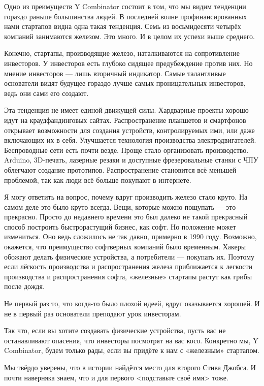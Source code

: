 \documentclass[ebook,12pt,oneside,openany]{memoir}
\begin{document}
\maketitle

Одно из преимуществ Y Combinator состоит в том, что мы видим тенденции
гораздо раньше большинства людей. В последней волне профинансированных
нами стартапов видна одна такая тенденция. Семь из восьмидесяти
четырёх компаний занимаются железом. Это много. И в целом их успехи
выше среднего.

Конечно, стартапы, производящие железо, наталкиваются на сопротивление
инвесторов. У инвесторов есть глубоко сидящее предубеждение против
них. Но мнение инвесторов — лишь вторичный индикатор. Самые
талантливые основатели видят будущее гораздо лучше самых
проницательных инвесторов, ведь они сами его создают.

Эта тенденция не имеет единой движущей силы. Хардварные проекты хорошо
идут на краудфандинговых сайтах. Распространение планшетов и
смартфонов открывает возможности для создания устройств,
контролируемых ими, или даже включающих их в себя. Улучшается
технология производства электродвигателей. Беспроводные сети есть
почти везде. Проще стало организовать производство. Arduino,
3D-печать, лазерные резаки и доступные фрезеровальные станки с ЧПУ
облегчают создание прототипов. Распространение становится всё меньшей
проблемой, так как люди всё больше покупают в интернете.

Я могу ответить на вопрос, почему вдруг производить железо стало
круто. На самом деле это было круто всегда. Вещи, которые можно
пощупать — это прекрасно. Просто до недавнего времени это был далеко
не такой прекрасный способ построить быстрорастущий бизнес, как софт.
Но положение может измениться. Оно ведь сложилось не так давно,
примерно в 1990 году. Возможно, окажется, что преимущество софтверных
компаний было временным. Хакеры обожают делать физические устройства,
а потребители — покупать их. Поэтому если лёгкость производства и
распространения железа приближается к легкости производства и
распространения софта, «железные» стартапы растут как грибы после
дождя.

Не первый раз то, что когда-то было плохой идеей, вдруг оказывается
хорошей. И не в первый раз основатели преподают урок инвесторам.

Так что, если вы хотите создавать физические устройства, пусть вас не
останавливают опасения, что инвесторы посмотрят на вас косо. Конкретно
мы, Y Combinator, будем только рады, если вы придёте к нам с
«железным» стартапом.

Мы твёрдо уверены, что в истории найдётся место для второго Стива
Джобса. И почти наверняка знаем, что и для первого <подставьте своё
имя> тоже.
\end{document}

